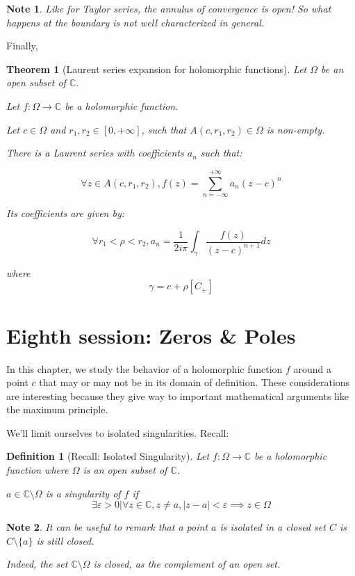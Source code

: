 \documentclass{article}
\newtheorem*{defi}{Definition}
\newtheorem*{note}{Note}
\newtheorem*{thm*}{Theorem}
\begin{document}
\begin{note}
    Like for Taylor series, the annulus of convergence is open! So what happens at the boundary is not well characterized in general.
\end{note}

Finally, 
\begin{thm*}
    [Laurent series expansion for holomorphic functions]
    Let $\Omega$ be an open subset of $\mathbb{C}$.

    Let $f: \Omega \rightarrow \mathbb{C}$ be a holomorphic function.
    
    Let $c\in\Omega$ and $r_1, r_2\in[0, +\infty]$, such that $A(c,r_1, r_2)\in\Omega$ is non-empty.

    There is a Laurent series with coefficients $a_n$ such that:

    $$ \forall z \in A(c, r_1, r_2), f(z) = \sum_{n=-\infty}^{+\infty}a_n(z-c)^n$$

Its coefficients are given by:

$$ \forall r_1 < \rho < r_2, 
a_n = \frac{1}{2i\pi} \int_\gamma \frac{f(z)}{{(z-c)^{n+1}}}dz$$

where 
$$ \gamma = c + \rho[C_+]$$
\end{thm*}


\newpage
\section{Eighth session: Zeros \& Poles}

In this chapter, we study the behavior of a holomorphic function $f$ around a point $c$ that may or may not be in its domain of definition. These considerations are interesting because they give way to important mathematical arguments like the maximum principle.

We'll limit ourselves to isolated singularities. Recall:
\begin{defi}[Recall: Isolated Singularity]
    Let $f: \Omega \rightarrow \mathbb{C}$ be a holomorphic function where $\Omega$ is an open subset of $\mathbb{C}$.
    
    $a\in\mathbb{C}\setminus\Omega$ is a singularity of $f$ if
    $$ \exists \varepsilon > 0 \vert \forall z\in\mathbb{C}, z \neq a, |z-a| < \varepsilon \implies z\in\Omega$$
\end{defi}

\begin{note}
    It can be useful to remark that a point $a$ is isolated in a closed set $C$ is $C\setminus \{a\}$ is still closed. 

    Indeed, the set $\mathbb{C}\setminus\Omega$ is closed, as the complement of an open set.
\end{note}
\end{document}
